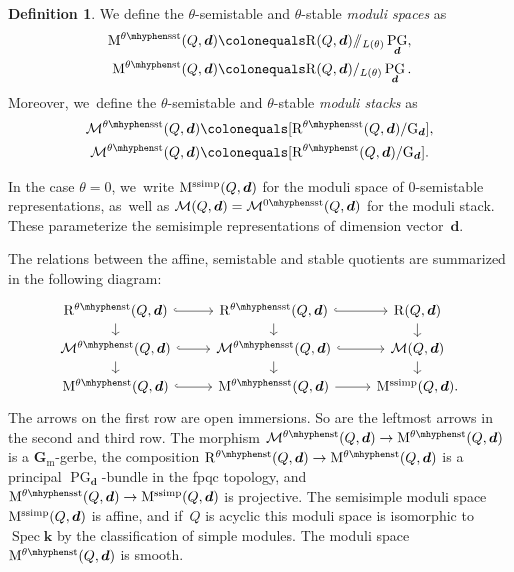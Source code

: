 \documentclass[11pt]{article}
\theoremstyle{plain}
\theoremstyle{definition}
\newtheorem{definition}[theorem]{Definition}
\DeclareMathOperator\PG{PG}
\DeclareMathOperator\Spec{Spec}
\newcommand\field{\mathbf{k}}
\newcommand\Gm{\ensuremath{\mathbf{G}_{\mathrm{m}}}}
\newcommand\group[1][\tuple{d}]{\mathrm{G}_{#1}}
\newcommand\semisimple{\ensuremath{\mathrm{ssimp}}}
\newcommand\semistable{\ensuremath{\mhyphen\mathrm{sst}}}
\newcommand\stable{\ensuremath{\mhyphen\mathrm{st}}}
\newcommand\tuple[1]{\ensuremath{{\boldsymbol{#1}}}}
\begin{document}
\begin{definition}
\label{definition:moduli}
We define the $\theta$-semistable and $\theta$-stable \emph{moduli spaces} as
\begin{align*}
\modulispace[\theta\semistable]{Q,\tuple{d}} & \colonequals \repspace{Q,\tuple{d}}/\!\!/_{L(\theta)} \PG_{\tuple{d}}, \\
\modulispace[\theta\stable]{Q,\tuple{d}} & \colonequals \repspace{Q,\tuple{d}}/_{L(\theta)} \PG_{\tuple{d}}.
\end{align*}
Moreover, we~define the $\theta$-semistable and $\theta$-stable \emph{moduli stacks} as
\begin{align*}
\modulistack[\theta\semistable]{Q,\tuple{d}} & \colonequals [\repspace[\theta\semistable]{Q,\tuple{d}}/\group], \\
\modulistack[\theta\stable]{Q,\tuple{d}} & \colonequals [\repspace[\theta\stable]{Q,\tuple{d}}/\group].
\end{align*}
\end{definition}

In the case $\theta = 0$, we~write $\modulispace[\semisimple]{Q,\tuple{d}}$
for the moduli space of $0$-semistable representations, as~well as $\modulistack{Q,\tuple{d}} = \modulistack[0\semistable]{Q,\tuple{d}}$
for the moduli stack.
These parameterize the semisimple representations of dimension vector~$\tuple{d}$.

The relations between the affine, semistable and stable quotients are summarized in the following diagram:
\begin{equation*}
\begin{tikzcd}[row sep=small, ampersand replacement=\&]
\repspace[\theta\stable]{Q,\tuple{d}} \arrow[r,hook] \arrow[d] \& \repspace[\theta\semistable]{Q,\tuple{d}} \arrow[r,hook] \arrow[d] \& \repspace{Q,\tuple{d}} \arrow[d] \\
\modulistack[\theta\stable]{Q,\tuple{d}} \arrow[r,hook] \arrow[d] \& \modulistack[\theta\semistable]{Q,\tuple{d}} \arrow[r,hook] \arrow[d] \& \modulistack{Q,\tuple{d}} \arrow[d] \\
\modulispace[\theta\stable]{Q,\tuple{d}} \arrow[r, hook] \& \modulispace[\theta\semistable]{Q,\tuple{d}} \arrow[r] \& \modulispace[\semisimple]{Q,\tuple{d}}.
\end{tikzcd}
\end{equation*}
The arrows on the first row are open immersions.
So are the leftmost arrows in the second and third row.
The morphism $\modulistack[\theta\stable]{Q,\tuple{d}} \to \modulispace[\theta\stable]{Q,\tuple{d}}$
is a $\Gm$-gerbe,
the composition $\repspace[\theta\stable]{Q,\tuple{d}} \to \modulispace[\theta\stable]{Q,\tuple{d}}$
is a principal $\PG_\tuple{d}$-bundle in the fpqc topology,
and $\modulispace[\theta\semistable]{Q,\tuple{d}} \to \modulispace[\semisimple]{Q,\tuple{d}}$ is projective.
The semisimple moduli space $\modulispace[\semisimple]{Q,\tuple{d}}$ is affine,
and if~$Q$ is acyclic
this moduli space is isomorphic to~$\Spec\field$
by the classification of simple modules.
The moduli space $\modulispace[\theta\stable]{Q,\tuple{d}}$ is smooth.
\end{document}
